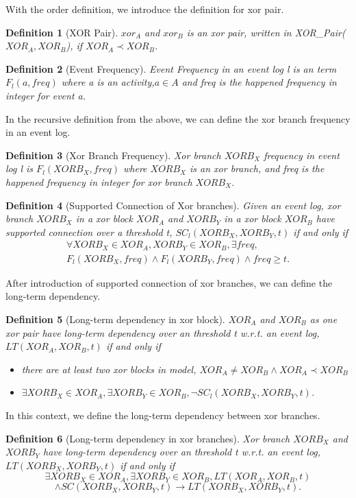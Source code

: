 \documentclass[]{article}
\newtheorem{mydef}{Definition}[section]
\begin{document}
With the order definition, we introduce the definition for xor pair.
\begin{mydef}[XOR Pair]
	$xor_A$ and $xor_B$ is an xor pair, written in XOR\_Pair($XOR_A, XOR_B$), if $XOR_A \prec XOR_B$.
\end{mydef}
\begin{mydef}[Event Frequency]
	Event Frequency in an event log l is an term $F_{l}(a,freq)$ where a is an activity,$a \in A$  and freq is the happened frequency in integer for event a.
\end{mydef}
In the recursive definition from the above, we can define the xor branch frequency in an event log.
\begin{mydef}[Xor Branch Frequency]
	Xor branch $XORB_X$ frequency in event log l is $F_{l}(XORB_X,freq)$ where $XORB_X$ is an xor branch, and freq is the happened frequency in integer for xor branch $XORB_X$.
\end{mydef}
\begin{mydef}[Supported Connection of Xor branches\footnotemark]
Given an event log, xor branch $XORB_X$ in a xor block $XOR_A$ and $XORB_Y$ in a xor block $XOR_B$ have supported connection over a threshold t, $SC_{l}(XORB_X,XORB_Y,t)$ if and only if
\begin{align*}
 \forall  XORB_X \in XOR_A, XORB_Y \in XOR_B, \exists freq, \\
 F_{l}(XORB_X,freq) \land F_{l}(XORB_Y,freq) \land freq \geq t. 
\end{align*}
\end{mydef}
After introduction of supported connection of xor branches, we can define the long-term dependency. 
\begin{mydef}[Long-term dependency in xor block]
	$XOR_A$ and $XOR_B$ as one xor pair have long-term dependency over an threshold t w.r.t. an event log, $LT(XOR_A, XOR_B, t) $ if and only if 
	\begin{itemize}
		\item there are at least two xor blocks in model, $XOR_A \neq XOR_B \land XOR_A \prec XOR_B$
		\item $\exists XORB_X \in XOR_A, \exists XORB_Y \in XOR_B, \lnot SC_{l}(XORB_X, XORB_Y, t)$. 
	\end{itemize}
\end{mydef}
In this context, we define the long-term dependency between xor branches.
\begin{mydef}[Long-term dependency in xor branches]
	Xor branch $XORB_X$ and $XORB_Y$ have long-term dependency over an threshold t w.r.t. an event log, $LT(XORB_X, XORB_Y, t) $ if and only if  
	\[\exists XORB_X \in XOR_A, \exists XORB_Y \in XOR_B, LT(XOR_A, XOR_B, t) \] \[ \land  SC(XORB_X, XORB_Y, t)  \rightarrow LT(XORB_X, XORB_Y, t).\]	
\end{mydef}
\end{document}
